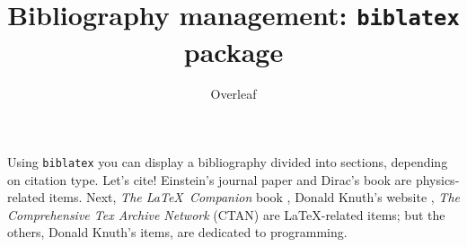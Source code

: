 \documentclass{article}
\title{Bibliography management: \texttt{biblatex} package}
\author{Overleaf}
\date{ }
\begin{document}
\maketitle

Using \texttt{biblatex} you can display a bibliography divided 
into sections, depending on citation type. Let's cite! Einstein's 
journal paper \cite{einstein} and Dirac's book \cite{dirac} are 
physics-related items. Next, \textit{The \LaTeX\ Companion} book
 \cite{latexcompanion}, Donald Knuth's website \cite{knuthwebsite},
\textit{The Comprehensive Tex Archive Network} (CTAN) 
\cite{ctan} are \LaTeX-related items; but the others, Donald Knuth's items, 
\cite{knuth-fa,knuth-acp} are dedicated to programming. 

\medskip

\printbibliography
\end{document}
